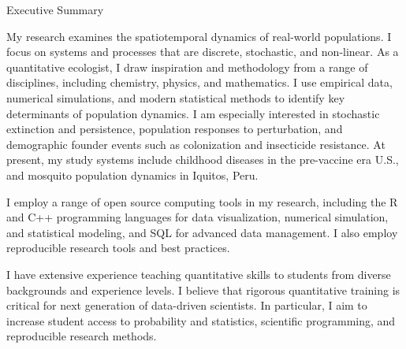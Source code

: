 \documentclass{resume} %
\begin{document}


\begin{rSection}{Executive Summary}
\item 
My research examines the spatiotemporal dynamics of real-world populations. 
I focus on systems and processes that are discrete, stochastic,
and non-linear. As a quantitative ecologist, I draw 
inspiration and methodology from a range of disciplines, including 
chemistry, physics, and mathematics.
I use empirical data, numerical simulations, and modern statistical methods to
identify key determinants of population dynamics.  I am especially interested
in stochastic extinction and persistence, population responses to
perturbation, and demographic founder events such
as colonization and insecticide resistance. At present, my study systems 
include childhood diseases in the pre-vaccine era U.S., and mosquito population 
dynamics in Iquitos, Peru.

\item I employ a range of open source computing 
tools in my research, including the R and C++ programming languages 
for data visualization,
numerical simulation, and statistical modeling, and SQL for 
advanced data management. I also employ reproducible research tools and 
best practices.

\item I have extensive experience teaching quantitative skills to students from diverse
backgrounds and experience levels. I believe that rigorous quantitative training is 
critical for next generation of data-driven scientists. In particular, I aim to increase
student access to probability and statistics, scientific programming,
and reproducible research methods.

\end{rSection}
\end{document}
